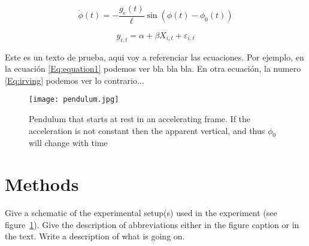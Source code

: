 \documentclass[letterpaper,12pt]{article}
\begin{document}
\begin{equation}
   \dot{\phi}(t) = -\frac{g_e(t)}{\ell} \sin\left(\phi(t)-\phi_0(t)\right)
   \label{Eq:equation1} %
\end{equation}

\begin{equation}
   y_{i,t} = \alpha + \beta X_{i,t} + \varepsilon_{i,t}
   \label{Eq:irving} %
\end{equation}

Este es un texto de prueba, aqui voy a referenciar las ecuaciones. Por
ejemplo, en la ecuación \ref{Eq:equation1} podemos ver bla bla bla.
En otra ecuación, la numero \ref{Eq:irving} podemos ver lo contrario...


\begin{figure}[!h]
    \centering
    \texttt{[image: pendulum.jpg]}
    \caption{Pendulum that starts at rest in an accelerating frame. If the acceleration is not constant then the apparent vertical, and thus $\phi_0$ will change with time}
    \label{fig:samplesetup}
\end{figure}

\blindtext %

\section{Methods}


Give a schematic of the experimental setup(s) used in the experiment (see
figure~\ref{fig:samplesetup}). Give the description of  abbreviations
either in the figure caption or in the text. Write a description of what is
going on. 

\end{document}
